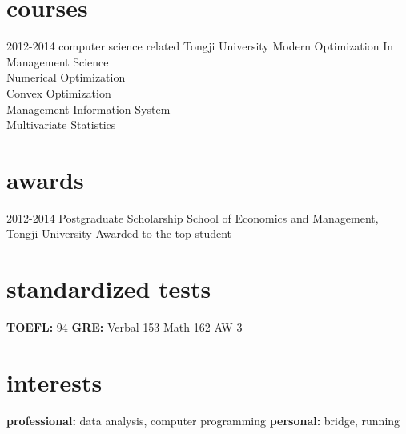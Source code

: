 \documentclass[]{friggeri-cv} %
\begin{document}
\section{courses}
\begin{entrylist}
\entry
{2012-2014}
{computer science related}
{Tongji University}
{Modern Optimization In Management Science\\
Numerical Optimization\\
Convex Optimization\\
Management Information System\\
Multivariate Statistics}
\end{entrylist}




\section{awards}
\begin{entrylist}
\entry
{2012-2014}
{Postgraduate Scholarship}
{School of Economics and Management, Tongji University}
{Awarded to the top student}
\end{entrylist}


\section{standardized tests}
{\textbf{TOEFL:} 94  \textbf{GRE:} Verbal 153 Math 162 AW 3}



\section{interests}
{\textbf{professional:} data analysis, computer programming  \textbf{personal:} bridge, running}
\end{document}
